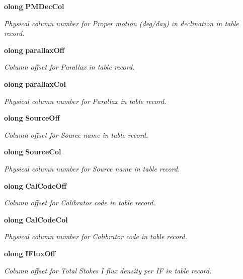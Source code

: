 \begin{CompactItemize}
{\bf olong} {\bf PMDec\-Col}
\begin{CompactList}\small\item\em Physical column number for Proper motion (deg/day) in declination in table record. \item\end{CompactList}\item 
{\bf olong} {\bf parallax\-Off}
\begin{CompactList}\small\item\em Column offset for Parallax in table record. \item\end{CompactList}\item 
{\bf olong} {\bf parallax\-Col}
\begin{CompactList}\small\item\em Physical column number for Parallax in table record. \item\end{CompactList}\item 
{\bf olong} {\bf Source\-Off}
\begin{CompactList}\small\item\em Column offset for Source name in table record. \item\end{CompactList}\item 
{\bf olong} {\bf Source\-Col}
\begin{CompactList}\small\item\em Physical column number for Source name in table record. \item\end{CompactList}\item 
{\bf olong} {\bf Cal\-Code\-Off}
\begin{CompactList}\small\item\em Column offset for Calibrator code in table record. \item\end{CompactList}\item 
{\bf olong} {\bf Cal\-Code\-Col}
\begin{CompactList}\small\item\em Physical column number for Calibrator code in table record. \item\end{CompactList}\item 
{\bf olong} {\bf IFlux\-Off}
\begin{CompactList}\small\item\em Column offset for Total Stokes I flux density per IF in table record. \item\end{CompactList}\item 

\end{CompactItemize}
